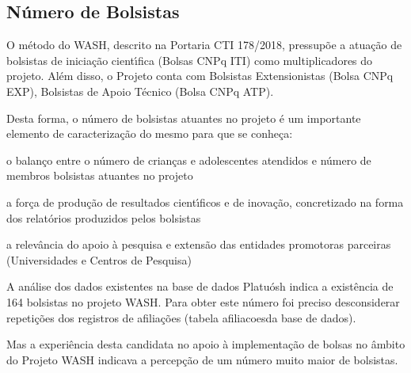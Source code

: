 \documentclass[
12pt,		%
openright,	%
twoside,  %
a4paper,			%
chapter=TITLE,		%
english,			%
french,				%
spanish,			%
brazil				%
]{USPSC-classe/USPSC_RedarTex}
\begin{document}
\subsection[N\'umero de Bolsistas]{N\'umero de Bolsistas}\label{N\'umero de Bolsistas}
O m\'etodo do WASH, descrito na Portaria CTI 178/2018, pressup\~oe a atua\c{c}\~ao de bolsistas de inicia\c{c}\~ao cient\'{\i}fica (Bolsas CNPq ITI) como multiplicadores do projeto. Al\'em disso, o Projeto conta com Bolsistas Extensionistas (Bolsa CNPq EXP), Bolsistas de Apoio T\'ecnico (Bolsa CNPq ATP).










Desta forma, o n\'umero de bolsistas atuantes no projeto \'e um importante elemento de caracteriza\c{c}\~ao do mesmo para que se conhe\c{c}a:











\begin{alineas}
\item o balan\c{c}o entre o n\'umero de crian\c{c}as e adolescentes atendidos e n\'umero de membros bolsistas atuantes no projeto
\item a for\c{c}a de produ\c{c}\~ao de resultados cient\'{\i}ficos e de inova\c{c}\~ao, concretizado na forma dos relat\'orios produzidos pelos bolsistas
\item a relev\^ancia do apoio \`a pesquisa e extens\~ao das entidades promotoras parceiras (Universidades e Centros de Pesquisa)
\end{alineas}

A an\'alise dos dados existentes na base de dados Platu\'osh indica a exist\^encia de 164 bolsistas no projeto WASH. Para obter este n\'umero foi preciso desconsiderar repeti\c{c}\~oes dos registros de afilia\c{c}\~oes (tabela \textquotedbl afiliacoes\textquotedbl  da base de dados).










Mas a experi\^encia desta candidata no apoio \`a implementa\c{c}\~ao de bolsas no \^ambito do Projeto WASH indicava a percep\c{c}\~ao de um n\'umero muito maior de bolsistas.
\end{document}
